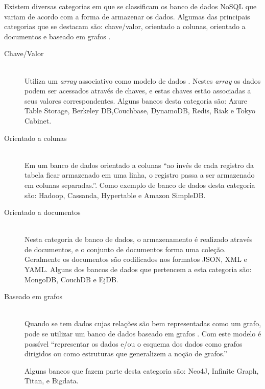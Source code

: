 Existem diversas categorias\cite{NosqlDatabase} em que se classificam os banco de dados NoSQL que variam de acordo com a forma de armazenar os dados. Algumas das  principais categorias que se destacam são: chave/valor, orientado a colunas, orientado a documentos e baseado em grafos \cite{AnaliseNosql}.
\begin{description}
\item[Chave/Valor] \hfill \\ 
Utiliza um \textit{array} associativo como modelo de dados \cite{NosqlWiki}. Nestes \textit{array} os dados podem ser acessados através de chaves, e estas chaves estão associadas a seus valores correspondentes. Alguns bancos desta categoria são: Azure Table Storage, Berkeley DB,Couchbase, DynamoDB, Redis, Riak e Tokyo Cabinet.

\item[Orientado a colunas] \hfill \\ 
Em um banco de dados orientado a colunas ``ao invés de cada registro da tabela ficar armazenado em uma linha, o registro passa a ser armazenado em colunas separadas.''\cite{NosqlCol}. Como exemplo de banco de dados desta categoria são:  Hadoop, Cassanda, Hypertable e Amazon SimpleDB.

\item[Orientado a documentos] \hfill \\ 
Nesta categoria de banco de dados, o armazenamento é realizado através de documentos, e o conjunto de documentos forma uma coleção. Geralmente os documentos são codificados nos formatos JSON, XML e YAML\cite{NosqlWiki}. Alguns dos bancos de dados que pertencem a esta categoria são: MongoDB, CouchDB e EjDB.


\item[Baseado em grafos] \hfill \\ 
Quando se tem dados cujas relações são bem representadas como um grafo, pode se  utilizar um banco de dados baseado em grafos \cite{NosqlWiki}. Com este modelo é possível ``representar os dados e/ou o esquema dos dados como grafos dirigidos ou como estruturas que generalizem a noção de grafos.'' \cite{IntNosql}

Alguns bancos que fazem parte desta categoria são: Neo4J, Infinite Graph, Titan, e Bigdata.

\end{description}


